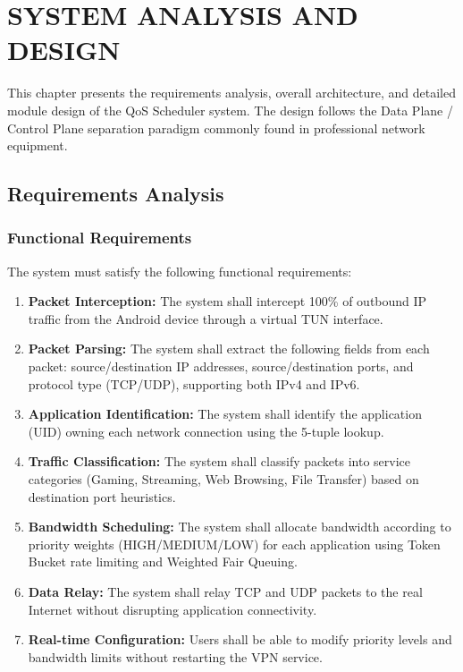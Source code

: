 
\chapter{SYSTEM ANALYSIS AND DESIGN}
\label{chap:design}

This chapter presents the requirements analysis, overall architecture, and detailed module design of the QoS Scheduler system. The design follows the Data Plane / Control Plane separation paradigm commonly found in professional network equipment.

\section{Requirements Analysis}
\label{sec:requirements}

\subsection{Functional Requirements}

The system must satisfy the following functional requirements:

\begin{enumerate}[label=\textbf{FR\arabic*.}]
    \item \textbf{Packet Interception:} The system shall intercept 100\% of outbound IP traffic from the Android device through a virtual TUN interface.
    \item \textbf{Packet Parsing:} The system shall extract the following fields from each packet: source/destination IP addresses, source/destination ports, and protocol type (TCP/UDP), supporting both IPv4 and IPv6.
    \item \textbf{Application Identification:} The system shall identify the application (UID) owning each network connection using the 5-tuple lookup.
    \item \textbf{Traffic Classification:} The system shall classify packets into service categories (Gaming, Streaming, Web Browsing, File Transfer) based on destination port heuristics.
    \item \textbf{Bandwidth Scheduling:} The system shall allocate bandwidth according to priority weights (HIGH/MEDIUM/LOW) for each application using Token Bucket rate limiting and Weighted Fair Queuing.
    \item \textbf{Data Relay:} The system shall relay TCP and UDP packets to the real Internet without disrupting application connectivity.
    \item \textbf{Real-time Configuration:} Users shall be able to modify priority levels and bandwidth limits without restarting the VPN service.
\end{enumerate}

